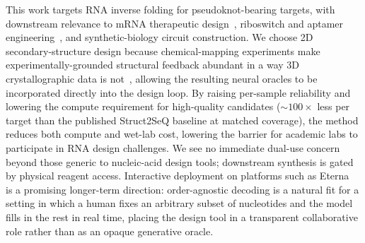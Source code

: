\documentclass{article}
\begin{document}
This work targets RNA inverse folding for pseudoknot-bearing
targets, with downstream relevance to mRNA therapeutic
design~\citep{damase2021limitless,zhang2023lineardesign},
riboswitch and aptamer
engineering~\citep{wachsmuth2013riboswitch,
penchovsky2014review,waymentsteele2022switches}, and synthetic-biology
circuit construction. We choose 2D secondary-structure design because
chemical-mapping experiments make experimentally-grounded structural
feedback abundant in a way 3D crystallographic data is
not~\citep{lee2014eterna,he2024ribonanza}, allowing the resulting
neural oracles to be incorporated directly into the design loop.
By raising per-sample reliability and lowering the compute requirement
for high-quality candidates (${\sim}100\times$ less per target than the
published Struct2SeQ baseline at matched coverage), the method reduces
both compute and wet-lab cost, lowering the barrier for academic labs
to participate in RNA design challenges. We see no immediate dual-use
concern beyond those generic to nucleic-acid design tools; downstream
synthesis is gated by physical reagent access. Interactive deployment
on platforms such as Eterna~\citep{lee2014eterna,
waymentsteele2022switches} is a promising longer-term direction:
order-agnostic decoding is a natural fit for a setting in which a
human fixes an arbitrary subset of nucleotides and the model fills in
the rest in real time, placing the design tool in a transparent
collaborative role rather than as an opaque generative oracle.



\end{document}
